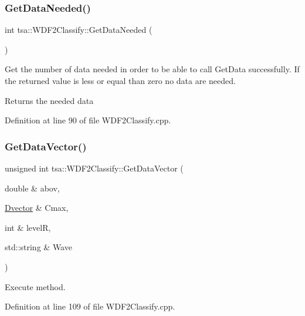 \subsubsection{\texorpdfstring{Get\+Data\+Needed()}{GetDataNeeded()}}
{\footnotesize\ttfamily int tsa\+::\+W\+D\+F2\+Classify\+::\+Get\+Data\+Needed (\begin{DoxyParamCaption}{ }\end{DoxyParamCaption})}

Get the number of data needed in order to be able to call Get\+Data successfully. If the returned value is less or equal than zero no data are needed.

\begin{DoxyReturn}{Returns}
the needed data 
\end{DoxyReturn}


Definition at line 90 of file W\+D\+F2\+Classify.\+cpp.

\mbox{\label{classtsa_1_1_w_d_f2_classify_ab1a24dc16c3b82462f83869c9bfef4ba}} 
\subsubsection{\texorpdfstring{Get\+Data\+Vector()}{GetDataVector()}}
{\footnotesize\ttfamily unsigned int tsa\+::\+W\+D\+F2\+Classify\+::\+Get\+Data\+Vector (\begin{DoxyParamCaption}\item[{double \&}]{abov,  }\item[{\hyperlink{namespacetsa_a8900fb03d849baf447a1a0efe2561fb2}{Dvector} \&}]{Cmax,  }\item[{int \&}]{levelR,  }\item[{std\+::string \&}]{Wave }\end{DoxyParamCaption})}



Execute method. 



Definition at line 109 of file W\+D\+F2\+Classify.\+cpp.

\mbox{\label{classtsa_1_1_w_d_f2_classify_afc7171cf690b0486d3b91d715c97bed2}} 
